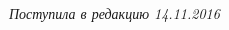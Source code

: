 \begin{multicols}{2}
{{\begin{thebibliography}{99}


\end{thebibliography}
} }

\end{multicols}

 \label{end\stat}

 \vspace*{-6pt}

\hfill{\small\textit{Поступила в редакцию  14.11.2016}}
\renewcommand{\figurename}{\protect\bf Рис.}
\renewcommand{\tablename}{\protect\bf Таблица}
